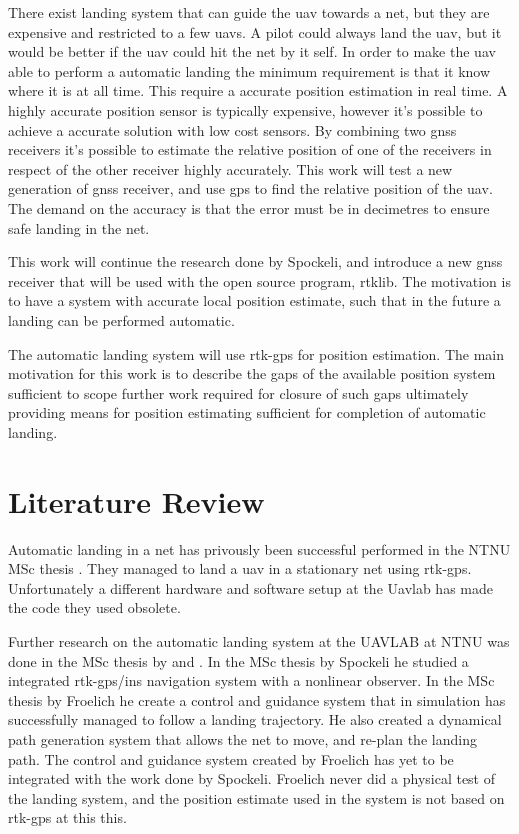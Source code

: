 There exist landing system that can guide the \gls{uav} towards a net, but they are expensive and restricted to a few \glspl{uav}. A pilot could always land the \gls{uav}, but it would be better if the \gls{uav} could hit the net by it self. In order to make the \gls{uav} able to perform a automatic landing the minimum requirement is that it know where it is at all time. This require a accurate position estimation in real time. A highly accurate position sensor is typically expensive, however it's possible to achieve a accurate solution with low cost sensors. By combining two \gls{gnss} receivers it's possible to estimate the relative position of one of the receivers in respect of the other receiver highly accurately. This work will test a new generation of \gls{gnss} receiver, and use \gls{gps} to find the relative position of the \gls{uav}. The demand on the accuracy is that the error must be in decimetres to ensure safe landing in the net.

This work will continue the research done by Spockeli, and introduce a new \gls{gnss} receiver that will be used with the open source program, rtklib. The motivation is to have a system with accurate local position estimate, such that in the future a landing can be performed automatic.

The automatic landing system will use \gls{rtk-gps} for position estimation. The main motivation for this work is to describe the gaps of the available position system sufficient to scope further work required for closure of such gaps ultimately providing means for position estimating sufficient for completion of automatic landing.
\section{Literature Review}
Automatic landing in a net has privously been successful performed in the NTNU MSc thesis \citep{Skulstad&Syversen}. They managed to land a \gls{uav} in a stationary net using \gls{rtk-gps}. Unfortunately a different hardware and software setup at the Uavlab has made the code they used obsolete.

Further research on the automatic landing system at the UAVLAB at NTNU was done in the MSc thesis by \citep{Spockeli} and \citep{Froelich}. In the MSc thesis by Spockeli he studied a integrated \gls{rtk-gps}/\gls{ins} navigation system with a nonlinear observer. In the MSc thesis by Froelich he create a control and guidance system that in simulation has successfully managed to follow a landing trajectory. He also created a dynamical path generation system that allows the net to move, and re-plan the landing path. The control and guidance system created by Froelich has yet to be integrated with the work done by Spockeli. Froelich never did a physical test of the landing system, and the position estimate used in the system is not based on \acrfull{rtk-gps} at this this.

